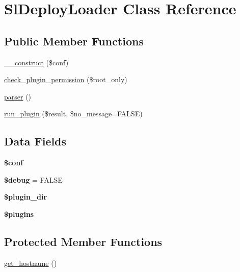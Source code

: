 \hypertarget{class_sl_deploy_loader}{
\section{SlDeployLoader Class Reference}
\label{class_sl_deploy_loader}
}
\subsection*{Public Member Functions}
\begin{DoxyCompactItemize}
\item 
\hyperlink{class_sl_deploy_loader_afe541ae0482352e532ac58d5b8eefe73}{\_\-\_\-construct} (\$conf)
\item 
\hyperlink{class_sl_deploy_loader_a9ceaaef3e53638fba09c32750d75bece}{check\_\-plugin\_\-permission} (\$root\_\-only)
\item 
\hyperlink{class_sl_deploy_loader_a764bbc5dc5d6cf4bcddde9ff3eea7db9}{parser} ()
\item 
\hyperlink{class_sl_deploy_loader_aa99e3e037eecbda06c564bdecdbcb07d}{run\_\-plugin} (\$result, \$no\_\-message=FALSE)
\end{DoxyCompactItemize}
\subsection*{Data Fields}
\begin{DoxyCompactItemize}
\item 
\hypertarget{class_sl_deploy_loader_ae4901046cc3e1deebf77ccc785384a78}{
{\bfseries \$conf}}
\label{class_sl_deploy_loader_ae4901046cc3e1deebf77ccc785384a78}

\item 
\hypertarget{class_sl_deploy_loader_a85ae3e64cd40e9564adceb010085e9dd}{
{\bfseries \$debug} = FALSE}
\label{class_sl_deploy_loader_a85ae3e64cd40e9564adceb010085e9dd}

\item 
\hypertarget{class_sl_deploy_loader_a99811555b30bde504a863e44015f2f19}{
{\bfseries \$plugin\_\-dir}}
\label{class_sl_deploy_loader_a99811555b30bde504a863e44015f2f19}

\item 
\hypertarget{class_sl_deploy_loader_a4ab51386acb82cd0a0066eac2567b2bd}{
{\bfseries \$plugins}}
\label{class_sl_deploy_loader_a4ab51386acb82cd0a0066eac2567b2bd}

\end{DoxyCompactItemize}
\subsection*{Protected Member Functions}
\begin{DoxyCompactItemize}
\item 
\hyperlink{class_sl_deploy_loader_a38980f2b9e4c06a156136d9e0de6b212}{get\_\-hostname} ()
\end{DoxyCompactItemize}
